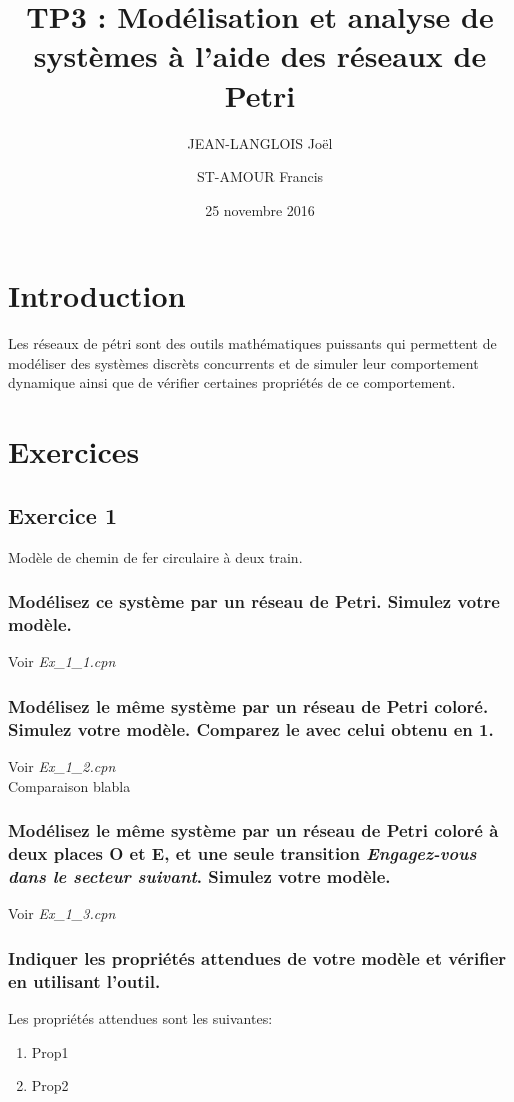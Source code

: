 \documentclass[french]{article}
\title{TP3 : Modélisation et analyse de systèmes à l'aide des réseaux de Petri}
\author{
    JEAN-LANGLOIS Joël
    \and
    ST-AMOUR Francis
  }
\date{25 novembre 2016}
\begin{document}
\maketitle

\section{Introduction}

Les réseaux de pétri sont des outils mathématiques puissants qui permettent de modéliser des systèmes discrèts concurrents et de simuler leur comportement dynamique ainsi que de vérifier certaines propriétés de ce comportement.

\section{Exercices}

\subsection{Exercice 1}
Modèle de chemin de fer circulaire à deux train.

\subsubsection{Modélisez ce système par un réseau de Petri. Simulez votre modèle.}
Voir \textit{Ex\_1\_1.cpn}
\subsubsection{Modélisez le même système par un réseau de Petri coloré. Simulez votre modèle. Comparez le avec celui obtenu 
en 1.}
Voir \textit{Ex\_1\_2.cpn} \\

Comparaison blabla
\subsubsection{Modélisez le même système par un réseau de Petri coloré à deux places O et E, et une seule transition 
\textit{Engagez-vous dans le secteur suivant}. Simulez votre modèle.}
Voir \textit{Ex\_1\_3.cpn}
\subsubsection{Indiquer les propriétés attendues de votre modèle et vérifier en utilisant l’outil.}
Les propriétés attendues sont les suivantes:
\begin{enumerate}
	\item Prop1
	\item Prop2
\end{enumerate}
\end{document}
